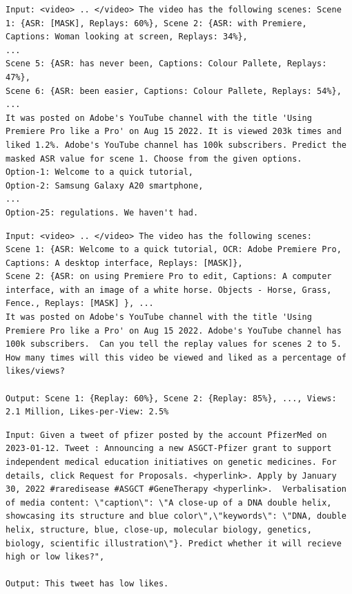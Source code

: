 \begin{lstlisting}[caption={Verbalization pattern of videos for the content simulation task:},frame=single,label={listing-video-content-simulation},basicstyle=\scriptsize]
Input: <video> .. </video> The video has the following scenes: Scene 1: {ASR: [MASK], Replays: 60%}, Scene 2: {ASR: with Premiere, Captions: Woman looking at screen, Replays: 34%},
...
Scene 5: {ASR: has never been, Captions: Colour Pallete, Replays: 47%},
Scene 6: {ASR: been easier, Captions: Colour Pallete, Replays: 54%},
...
It was posted on Adobe's YouTube channel with the title 'Using Premiere Pro like a Pro' on Aug 15 2022. It is viewed 203k times and liked 1.2%. Adobe's YouTube channel has 100k subscribers. Predict the masked ASR value for scene 1. Choose from the given options.
Option-1: Welcome to a quick tutorial, 
Option-2: Samsung Galaxy A20 smartphone,
...
Option-25: regulations. We haven't had.
\end{lstlisting}

\begin{lstlisting}[caption={Verbalization pattern of videos for the behavior simulation task:},frame=single,label={listing:behavior-simulation-video-verbalization},basicstyle=\scriptsize]
Input: <video> .. </video> The video has the following scenes: 
Scene 1: {ASR: Welcome to a quick tutorial, OCR: Adobe Premiere Pro, Captions: A desktop interface, Replays: [MASK]}, 
Scene 2: {ASR: on using Premiere Pro to edit, Captions: A computer interface, with an image of a white horse. Objects - Horse, Grass, Fence., Replays: [MASK] }, ... 
It was posted on Adobe's YouTube channel with the title 'Using Premiere Pro like a Pro' on Aug 15 2022. Adobe's YouTube channel has 100k subscribers.  Can you tell the replay values for scenes 2 to 5. How many times will this video be viewed and liked as a percentage of likes/views? 

Output: Scene 1: {Replay: 60%}, Scene 2: {Replay: 85%}, ..., Views: 2.1 Million, Likes-per-View: 2.5%
\end{lstlisting}



\begin{lstlisting}[caption={Verbalization pattern of Twitter posts for the behavior simulation task:},frame=single,label={listing-twitter-behavior-simulation},basicstyle=\scriptsize]
Input: Given a tweet of pfizer posted by the account PfizerMed on 2023-01-12. Tweet : Announcing a new ASGCT-Pfizer grant to support independent medical education initiatives on genetic medicines. For details, click Request for Proposals. <hyperlink>. Apply by January 30, 2022 #raredisease #ASGCT #GeneTherapy <hyperlink>.  Verbalisation of media content: \"caption\": \"A close-up of a DNA double helix, showcasing its structure and blue color\",\"keywords\": \"DNA, double helix, structure, blue, close-up, molecular biology, genetics, biology, scientific illustration\"}. Predict whether it will recieve high or low likes?", 

Output: This tweet has low likes.
\end{lstlisting}


